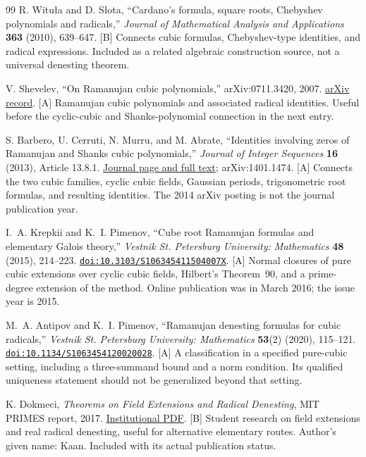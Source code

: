 \documentclass[11pt,a4paper]{article}
\numberwithin{equation}{section}
\theoremstyle{definition}\newtheorem{definition}[theorem]{Definition}
\theoremstyle{remark}\newtheorem{remark}[theorem]{Remark}
\newcommand{\doi}[1]{\href{https://doi.org/#1}{\nolinkurl{doi:#1}}}
\newcommand{\access}[2]{\href{#1}{#2}}
\newcommand{\status}[1]{\textsf{\footnotesize[#1]}}
\begin{document}
\begin{thebibliography}{99}
 R. Witu\l a and D. S\l ota, ``Cardano's formula, square roots, Chebyshev polynomials and radicals,'' \emph{Journal of Mathematical Analysis and Applications} \textbf{363} (2010), 639--647. \status{B}
Connects cubic formulas, Chebyshev-type identities, and radical expressions. Included as a related algebraic construction source, not a universal denesting theorem.

 V. Shevelev, ``On Ramanujan cubic polynomials,'' arXiv:0711.3420, 2007.
\access{https://arxiv.org/abs/0711.3420}{arXiv record}. \status{A}
Ramanujan cubic polynomials and associated radical identities. Useful before the cyclic-cubic and Shanks-polynomial connection in the next entry.

 S. Barbero, U. Cerruti, N. Murru, and M. Abrate, ``Identities involving zeros of Ramanujan and Shanks cubic polynomials,'' \emph{Journal of Integer Sequences} \textbf{16} (2013), Article 13.8.1.
\access{https://cs.uwaterloo.ca/journals/JIS/VOL16/Barbero/barbero11.html}{Journal page and full text}; arXiv:1401.1474. \status{A}
Connects the two cubic families, cyclic cubic fields, Gaussian periods, trigonometric root formulas, and resulting identities. The 2014 arXiv posting is not the journal publication year.

 I.~A. Krepkii and K.~I. Pimenov, ``Cube root Ramanujan formulas and elementary Galois theory,'' \emph{Vestnik St. Petersburg University: Mathematics} \textbf{48} (2015), 214--223. \doi{10.3103/S106345411504007X}. \status{A}
Normal closures of pure cubic extensions over cyclic cubic fields, Hilbert's Theorem~90, and a prime-degree extension of the method. Online publication was in March 2016; the issue year is 2015.

 M.~A. Antipov and K.~I. Pimenov, ``Ramanujan denesting formulas for cubic radicals,'' \emph{Vestnik St. Petersburg University: Mathematics} \textbf{53}(2) (2020), 115--121. \doi{10.1134/S1063454120020028}. \status{A}
A classification in a specified pure-cubic setting, including a three-summand bound and a norm condition. Its qualified uniqueness statement should not be generalized beyond that setting.

 K. Dokmeci, \emph{Theorems on Field Extensions and Radical Denesting}, MIT PRIMES report, 2017.
\access{https://math.mit.edu/research/highschool/primes/materials/2017/Dokmeci.pdf}{Institutional PDF}. \status{B}
Student research on field extensions and real radical denesting, useful for alternative elementary routes. Author's given name: Kaan. Included with its actual publication status.


\end{thebibliography}
\end{document}
